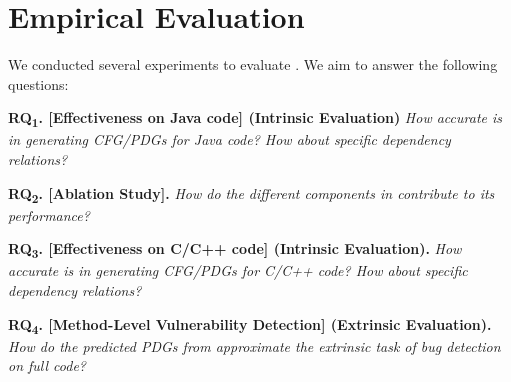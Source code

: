 \section{Empirical Evaluation}
\label{sec:eval}

We conducted several experiments to evaluate {\tool}. We aim to
answer the following questions:

\vspace{2pt}

\noindent \textbf{RQ\textsubscript{1}. [Effectiveness on Java code]
  (Intrinsic Evaluation)} {\em How accurate is {\tool} in generating CFG/PDGs for Java code? How about specific dependency relations?}
  


\vspace{2pt}
\noindent \textbf{RQ\textsubscript{2}. [Ablation Study].} {\em How do
  the different components in \tool contribute to its performance?}


\vspace{2pt}
\noindent \textbf{RQ\textsubscript{3}. [Effectiveness on C/C++ code]
(Intrinsic Evaluation).}  {\em How accurate is {\tool} in generating CFG/PDGs for C/C++ code? How about specific dependency relations?}


\vspace{2pt}
\noindent \textbf{RQ\textsubscript{4}. [Method-Level Vulnerability Detection] 
(Extrinsic Evaluation).}  {\em How do the predicted PDGs
    from \tool approximate the extrinsic task of bug detection on full
    code?}

